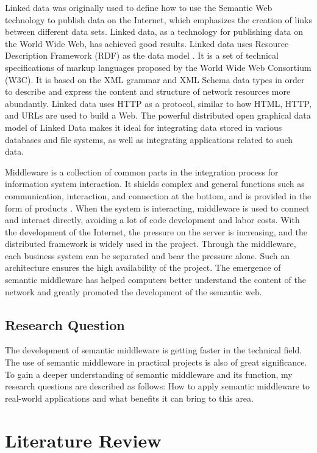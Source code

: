 \documentclass[conference]{IEEEtran}
\begin{document}
Linked data was originally used to define how to use the Semantic Web technology to publish data on the Internet, which emphasizes the creation of links between different data sets. Linked data, as a technology for publishing data on the World Wide Web, has achieved good results. Linked data uses Resource Description Framework (RDF) as the data model \cite{b2}. It is a set of technical specifications of markup languages proposed by the World Wide Web Consortium (W3C). It is based on the XML grammar and XML Schema data types in order to describe and express the content and structure of network resources more abundantly. Linked data uses HTTP as a protocol, similar to how HTML, HTTP, and URLs are used to build a Web. The powerful distributed open graphical data model of Linked Data makes it ideal for integrating data stored in various databases and file systems, as well as integrating applications related to such data.

Middleware is a collection of common parts in the integration process for information system interaction. It shields complex and general functions such as communication, interaction, and connection at the bottom, and is provided in the form of products \cite{b3}. When the system is interacting, middleware is used to connect and interact directly, avoiding a lot of code development and labor costs. With the development of the Internet, the pressure on the server is increasing, and the distributed framework is widely used in the project. Through the middleware, each business system can be separated and bear the pressure alone. Such an architecture ensures the high availability of the project. The emergence of semantic middleware has helped computers better understand the content of the network and greatly promoted the development of the semantic web.

\subsection{Research Question}
The development of semantic middleware is getting faster in the technical field. The use of semantic middleware in practical projects is also of great significance. To gain a deeper understanding of semantic middleware and its function, my research questions are described as follows: 
How to apply semantic middleware to real-world applications and what benefits it can bring to this area.

\section{Literature Review}
\end{document}
